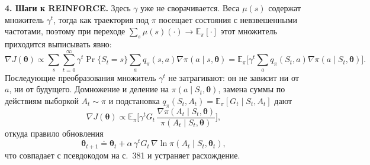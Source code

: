 \begin{solution}
    \textbf{4. Шаги к REINFORCE.} Здесь $\gamma$ уже не сворачивается. Веса
    $\mu(s)$ содержат множитель $\gamma^t$, тогда как траектория под $\pi$
    посещает состояния с невзвешенными частотами, поэтому при переходе
    $\sum_s\mu(s)(\cdot)\to\mathbb E_\pi[\cdot]$ этот множитель приходится
    выписывать явно:
    \[
        \nabla J(\boldsymbol\theta)
        \propto \sum_s\sum_{t=0}^{\infty}\gamma^t\Pr\{S_t=s\}\sum_a q_\pi(s,a)\nabla\pi(a\mid s,\boldsymbol\theta)
        = \mathbb E_\pi\Big[\gamma^t\sum_a q_\pi(S_t,a)\nabla\pi(a\mid S_t,\boldsymbol\theta)\Big].
    \]
    Последующие преобразования множитель $\gamma^t$ не затрагивают: он не зависит
    ни от $a$, ни от будущего. Домножение и деление на $\pi(a\mid S_t,\boldsymbol\theta)$,
    замена суммы по действиям выборкой $A_t\sim\pi$ и подстановка
    $q_\pi(S_t,A_t)=\mathbb E_\pi[G_t\mid S_t,A_t]$ дают
    \[
        \nabla J(\boldsymbol\theta)
        \propto \mathbb E_\pi\Big[\gamma^t G_t\,
        \frac{\nabla\pi(A_t\mid S_t,\boldsymbol\theta)}{\pi(A_t\mid S_t,\boldsymbol\theta)}\Big],
    \]
    откуда правило обновления
    \begin{equation}
        \boldsymbol\theta_{t+1} \doteq \boldsymbol\theta_t
        + \alpha\,\gamma^t G_t\,\nabla\ln\pi(A_t\mid S_t,\boldsymbol\theta_t),
        \tag{13.8$'$}
    \end{equation}
    что совпадает с псевдокодом на с.\ 381 и устраняет расхождение.
\end{solution}

